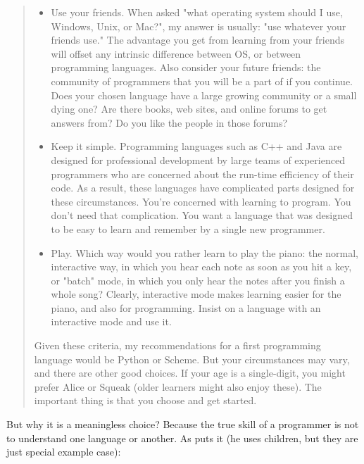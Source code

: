 \begin{quote}
    \begin{itemize}
        \item Use your friends. When asked "what operating system should I use,
        Windows, Unix, or Mac?", my answer is usually: "use whatever your friends
        use." The advantage you get from learning from your friends will offset any
        intrinsic difference between OS, or between programming languages. Also
        consider your future friends: the community of programmers that you will be
        a part of if you continue. Does your chosen language have a large growing
        community or a small dying one? Are there books, web sites, and online
        forums to get answers from? Do you like the people in those forums?  
        
        \item Keep it simple. Programming languages such as C++ and Java are designed for
        professional development by large teams of experienced programmers who are
        concerned about the run-time efficiency of their code. As a result, these
        languages have complicated parts designed for these circumstances. You're
        concerned with learning to program. You don't need that complication. You
        want a language that was designed to be easy to learn and remember by a
        single new programmer.  
        \item Play. Which way would you rather learn to play
        the piano: the normal, interactive way, in which you hear each note as soon
        as you hit a key, or "batch" mode, in which you only hear the notes after
        you finish a whole song? Clearly, interactive mode makes learning easier for
        the piano, and also for programming. Insist on a language with an
        interactive mode and use it.  
    \end{itemize} 
    
    Given these criteria, my recommendations for a first programming language
    would be Python or Scheme.  But your circumstances may vary, and there are
    other good choices. If your age is a single-digit, you might prefer Alice or
    Squeak (older learners might also enjoy these). The important thing is that
    you choose and get started.  
\end{quote}

But why it is a meaningless choice? Because the true skill of a programmer is
not to understand one language or another. As \cite{education:papert_mindstorms}
puts it (he uses children, but they are just special example case):

